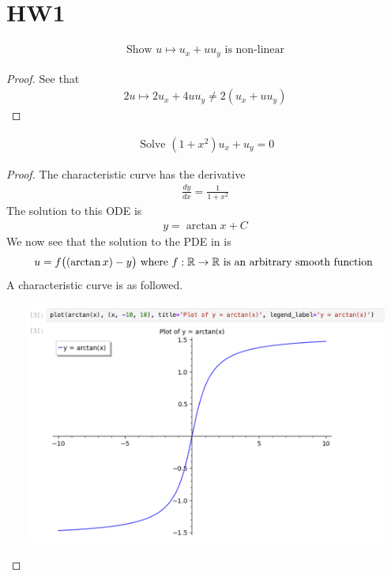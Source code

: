 \documentclass{report}
\begin{document}
\section{HW1}
\begin{theorem}
\begin{align*}
\text{ Show }u\mapsto u_x+uu_y\text{ is non-linear }
\end{align*}
\end{theorem}
\begin{proof}
See that 
\begin{align}
\label{he1}
2u\mapsto 2u_x+4uu_y\neq 2(u_x+uu_y)
\end{align}
\end{proof}
\begin{theorem}
\begin{align*}
\text{ Solve }(1+x^2)u_x+u_y=0
\end{align*}
\end{theorem}
\begin{proof}
The characteristic curve has the derivative 
\begin{align*}
\frac{dy}{dx}=\frac{1}{1+x^2}
\end{align*}
The solution to this ODE is 
\begin{align*}
y=\arctan x + C
\end{align*}
We now see that the solution to the PDE in  is 
\begin{align*}
u=f\big((\arctan x)-y\big)\text{ where }f:\mathbb{R}\rightarrow \mathbb{R}\text{ is an arbitrary smooth function }
\end{align*}
A characteristic curve is as followed.
\begin{center}
   \begin{minipage}{0.9\linewidth}  
       \centering       
\includegraphics[height=8cm,width=15cm]{pdehw1}
   \end{minipage}
\end{center}
\end{proof}
\end{document}
